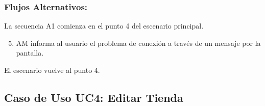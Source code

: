 \begin{framed}
\subsubsection{Flujos Alternativos: }

La secuencia A1 comienza en el punto 4 del escenario principal. 
\begin{enumerate}
    \setcounter{enumi}{4}
    \item AM informa al usuario el problema de conexión a través de un mensaje por la pantalla.
\end{enumerate}
El escenario vuelve al punto 4.

\end{framed}


\subsection{Caso de Uso UC4: Editar Tienda}

